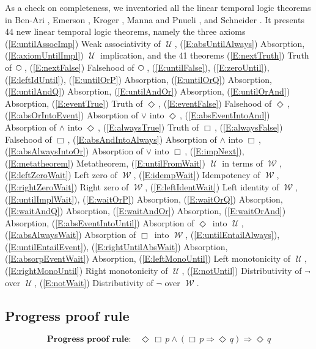 \documentclass[12pt, fleqn, leqno]{article}
\newcommand{\impl}{\ensuremath{\Rightarrow}}        %
\newcommand{\Until}{\;\mathcal{U}\;}
\newcommand{\Wait}{\;\mathcal{W}\;}
\newcommand{\Next}{\;\,\text{\raisebox{3.5pt}{\circle{6}}}}
\newcommand{\Event}{\Diamond\,}
\newcommand{\Always}{\Box\,}
\begin{document}
As a check on completeness, we inventoried all the linear temporal logic theorems in Ben-Ari \cite{Ben2}, Emerson \cite{Emer}, Kroger \cite{Kroger}, Manna and Pnueli \cite{Manna}, and Schneider \cite{Schn}.
It presents 44 new linear temporal logic theorems, namely the three axioms
(\ref{E:untilAssocImp}) Weak associativity of $\Until$,
(\ref{E:absUntilAlways}) Absorption,
(\ref{E:axiomUntilImpl}) $\Until$ implication,
and the 41 theorems
(\ref{E:nextTruth}) Truth of $\Next$,
(\ref{E:nextFalse}) Falsehood of $\Next$,
(\ref{E:untilFalse}),
(\ref{E:zeroUntil}),
(\ref{E:leftIdUntil}),
(\ref{E:untilOrP}) Absorption,
(\ref{E:untilOrQ}) Absorption,
(\ref{E:untilAndQ}) Absorption,
(\ref{E:untilAndOr}) Absorption,
(\ref{E:untilOrAnd}) Absorption,
(\ref{E:eventTrue}) Truth of $\Event$,
(\ref{E:eventFalse}) Falsehood of $\Event$,
(\ref{E:absOrIntoEvent}) Absorption of $\lor$ into $\Event$,
(\ref{E:absEventIntoAnd}) Absorption of $\land$ into $\Event$,
(\ref{E:alwaysTrue}) Truth of $\Always$,
(\ref{E:alwaysFalse}) Falsehood of $\Always$,
(\ref{E:absAndIntoAlways}) Absorption of $\land$ into $\Always$,
(\ref{E:absAlwaysIntoOr}) Absorption of $\lor$ into $\Always$,
(\ref{E:impNext}),
(\ref{E:metatheorem}) Metatheorem,
(\ref{E:untilFromWait}) $\Until$ in terms of $\Wait$,
(\ref{E:leftZeroWait}) Left zero of $\Wait$,
(\ref{E:idempWait}) Idempotency of $\Wait$,
(\ref{E:rightZeroWait}) Right zero of $\Wait$,
(\ref{E:leftIdentWait}) Left identity of $\Wait$,
(\ref{E:untilImplWait}),
(\ref{E:waitOrP}) Absorption,
(\ref{E:waitOrQ}) Absorption,
(\ref{E:waitAndQ}) Absorption,
(\ref{E:waitAndOr}) Absorption,
(\ref{E:waitOrAnd}) Absorption,
(\ref{E:absEventIntoUntil}) Absorption of $\Event$ into $\Until$,
(\ref{E:absAlwaysWait}) Absorption of $\Always$ into $\Wait$,
(\ref{E:untilEntailAlways}),
(\ref{E:untilEntailEvent}),
(\ref{E:rightUntilAbsWait}) Absorption,
(\ref{E:absorpEventWait}) Absorption,
(\ref{E:leftMonoUntil}) Left monotonicity of $\Until$,
(\ref{E:rightMonoUntil}) Right monotonicity of $\Until$,
(\ref{E:notUntil}) Distributivity of $\neg$ over $\Until$,
(\ref{E:notWait}) Distributivity of $\neg$ over $\Wait$.

\subsection{Progress proof rule}

\begin{equation}\label{E:PrProofRule}
\textbf{Progress proof rule:}\quad \Event\Always p \land (\Always p \impl \Event q) \impl \Event q
\end{equation}
\end{document}
